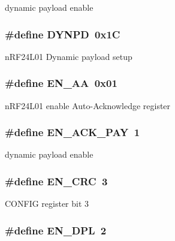 \label{group__nordic__hal__nrf__reg_ga8907dbd1fe9dfedbaf8824dbfcfd4f65}
dynamic payload enable \hypertarget{group__nordic__hal__nrf__reg_gae79cde384e0b6a5549efb001589a79ec}{
\subsubsection[{DYNPD}]{\setlength{\rightskip}{0pt plus 5cm}\#define DYNPD~0x1C}}
\label{group__nordic__hal__nrf__reg_gae79cde384e0b6a5549efb001589a79ec}
nRF24L01 Dynamic payload setup \hypertarget{group__nordic__hal__nrf__reg_gaa84a282351a2c9b83dd653df6ac59216}{
\subsubsection[{EN\_\-AA}]{\setlength{\rightskip}{0pt plus 5cm}\#define EN\_\-AA~0x01}}
\label{group__nordic__hal__nrf__reg_gaa84a282351a2c9b83dd653df6ac59216}
nRF24L01 enable Auto-\/Acknowledge register \hypertarget{group__nordic__hal__nrf__reg_ga1a275ad559fa85d8278f06052baab004}{
\subsubsection[{EN\_\-ACK\_\-PAY}]{\setlength{\rightskip}{0pt plus 5cm}\#define EN\_\-ACK\_\-PAY~1}}
\label{group__nordic__hal__nrf__reg_ga1a275ad559fa85d8278f06052baab004}
dynamic payload enable \hypertarget{group__nordic__hal__nrf__reg_gaece57618cf42f6b1b520341ef19a66f8}{
\subsubsection[{EN\_\-CRC}]{\setlength{\rightskip}{0pt plus 5cm}\#define EN\_\-CRC~3}}
\label{group__nordic__hal__nrf__reg_gaece57618cf42f6b1b520341ef19a66f8}
CONFIG register bit 3 \hypertarget{group__nordic__hal__nrf__reg_ga1b46f8336bda068b0759f70cceec3b65}{
\subsubsection[{EN\_\-DPL}]{\setlength{\rightskip}{0pt plus 5cm}\#define EN\_\-DPL~2}}

